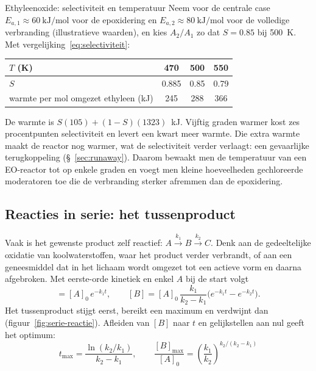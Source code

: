 \begin{voorbeeld}{Ethyleenoxide: selectiviteit en temperatuur}
Neem voor de centrale case $E_{a,1} \approx \SI{60}{\kilo\joule\per\mole}$ voor de epoxidering en $E_{a,2} \approx \SI{80}{\kilo\joule\per\mole}$ voor de volledige verbranding (illustratieve waarden), en kies $A_2/A_1$ zo dat $S = 0.85$ bij \SI{500}{\kelvin}. Met vergelijking~\eqref{eq:selectiviteit}:
\begin{center}
\begin{tabular}{lccc}
\toprule
$T$ (K) & 470 & 500 & 550 \\
\midrule
$S$ & 0.885 & 0.85 & 0.79 \\
warmte per mol omgezet ethyleen (kJ) & 245 & 288 & 366 \\
\bottomrule
\end{tabular}
\end{center}
De warmte is $S(105) + (1-S)(1323)$~kJ. Vijftig graden warmer kost zes procentpunten selectiviteit en levert een kwart meer warmte. Die extra warmte maakt de reactor nog warmer, wat de selectiviteit verder verlaagt: een gevaarlijke terugkoppeling (\S~\ref{sec:runaway}). Daarom bewaakt men de temperatuur van een EO-reactor tot op enkele graden en voegt men kleine hoeveelheden gechloreerde moderatoren toe die de verbranding sterker afremmen dan de epoxidering.
\end{voorbeeld}

\subsection{Reacties in serie: het tussenproduct}
\label{sec:serie-reacties}

Vaak is het gewenste product zelf reactief: $A \xrightarrow{k_1} B \xrightarrow{k_2} C$. Denk aan de gedeeltelijke oxidatie van koolwaterstoffen, waar het product verder verbrandt, of aan een geneesmiddel dat in het lichaam wordt omgezet tot een actieve vorm en daarna afgebroken. Met eerste-orde kinetiek en enkel $A$ bij de start volgt
\begin{equation}
[A] = [A]_0\,e^{-k_1t},
\qquad
[B] = [A]_0\,\frac{k_1}{k_2-k_1}\bigl(e^{-k_1t} - e^{-k_2t}\bigr).
\label{eq:serie}
\end{equation}
Het tussenproduct stijgt eerst, bereikt een maximum en verdwijnt dan (figuur~\ref{fig:serie-reactie}). Afleiden van $[B]$ naar $t$ en gelijkstellen aan nul geeft het optimum:
\begin{equation}
\boxed{\;t_\mathrm{max} = \frac{\ln(k_2/k_1)}{k_2-k_1},
\qquad
\frac{[B]_\mathrm{max}}{[A]_0} = \left(\frac{k_1}{k_2}\right)^{k_2/(k_2-k_1)}\;}
\label{eq:serie-max}
\end{equation}

